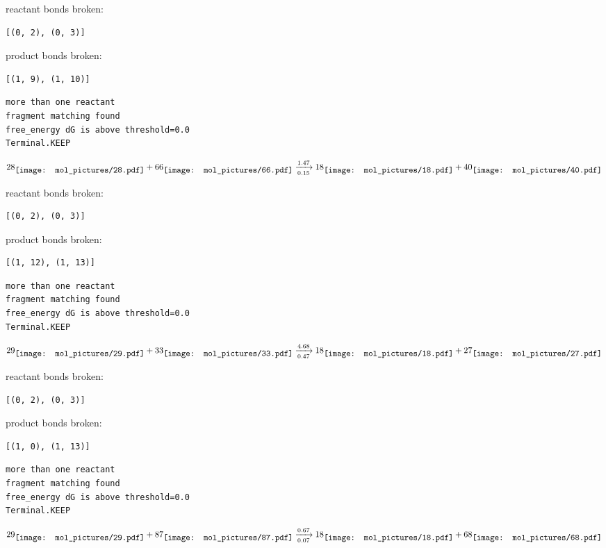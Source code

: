 \documentclass{article}
\begin{document}
reactant bonds broken:\begin{verbatim}
[(0, 2), (0, 3)]
\end{verbatim}
product bonds broken:\begin{verbatim}
[(1, 9), (1, 10)]
\end{verbatim}




\vspace{1cm}
\begin{verbatim}
more than one reactant
fragment matching found
free_energy dG is above threshold=0.0
Terminal.KEEP
\end{verbatim}
$$
28
\raisebox{-.5\height}{\texttt{[image: mol\_pictures/28.pdf]}}
+
66
\raisebox{-.5\height}{\texttt{[image: mol\_pictures/66.pdf]}}
\xrightarrow[0.15]{1.47}
18
\raisebox{-.5\height}{\texttt{[image: mol\_pictures/18.pdf]}}
+
40
\raisebox{-.5\height}{\texttt{[image: mol\_pictures/40.pdf]}}
$$


reactant bonds broken:\begin{verbatim}
[(0, 2), (0, 3)]
\end{verbatim}
product bonds broken:\begin{verbatim}
[(1, 12), (1, 13)]
\end{verbatim}




\vspace{1cm}
\begin{verbatim}
more than one reactant
fragment matching found
free_energy dG is above threshold=0.0
Terminal.KEEP
\end{verbatim}
$$
29
\raisebox{-.5\height}{\texttt{[image: mol\_pictures/29.pdf]}}
+
33
\raisebox{-.5\height}{\texttt{[image: mol\_pictures/33.pdf]}}
\xrightarrow[0.47]{4.68}
18
\raisebox{-.5\height}{\texttt{[image: mol\_pictures/18.pdf]}}
+
27
\raisebox{-.5\height}{\texttt{[image: mol\_pictures/27.pdf]}}
$$


reactant bonds broken:\begin{verbatim}
[(0, 2), (0, 3)]
\end{verbatim}
product bonds broken:\begin{verbatim}
[(1, 0), (1, 13)]
\end{verbatim}




\vspace{1cm}
\begin{verbatim}
more than one reactant
fragment matching found
free_energy dG is above threshold=0.0
Terminal.KEEP
\end{verbatim}
$$
29
\raisebox{-.5\height}{\texttt{[image: mol\_pictures/29.pdf]}}
+
87
\raisebox{-.5\height}{\texttt{[image: mol\_pictures/87.pdf]}}
\xrightarrow[0.07]{0.67}
18
\raisebox{-.5\height}{\texttt{[image: mol\_pictures/18.pdf]}}
+
68
\raisebox{-.5\height}{\texttt{[image: mol\_pictures/68.pdf]}}
$$
\end{document}
